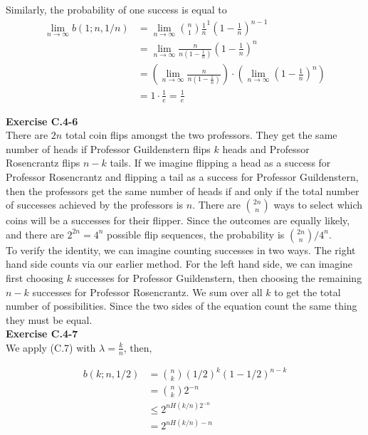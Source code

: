 \documentclass{article}
\begin{document}
Similarly, the probability of one success is equal to
\begin{align*}
\lim_{n\rightarrow\infty}b(1;n,1/n) &= \lim_{n\rightarrow \infty} \binom{n}{1} \frac{1}{n}^1 (1- \frac{1}{n})^{n-1}\\
&=\lim_{n\rightarrow \infty} \frac{n}{n(1-\frac{1}{n})} (1- \frac{1}{n})^{n}\\
&=\left(\lim_{n\rightarrow \infty} \frac{n}{n(1-\frac{1}{n})}\right) \cdot \left( \lim_{n\rightarrow\infty} (1- \frac{1}{n})^{n}\right)\\
&= 1 \cdot \frac{1}{e} = \frac{1}{e}
\end{align*}

\noindent\textbf{Exercise C.4-6}\\

There are $2n$ total coin flips amongst the two professors.  They get the same number of heads if Professor Guildenstern flips $k$ heads and Professor Rosencrantz flips $n-k$ tails. If we imagine flipping a head as a success for Professor Rosencrantz and flipping a tail as a success for Professor Guildenstern, then the professors get the same number of heads if and only if the total number of successes achieved by the professors is $n$.  There are ${2n \choose n}$ ways to select which coins will be a successes for their flipper.  Since the outcomes are equally likely, and there are $2^{2n} = 4^n$ possible flip sequences, the probability is ${2n \choose n} / 4^n$.  \\

To verify the identity, we can imagine counting successes in two ways.  The right hand side counts via our earlier method.  For the left hand side, we can imagine first choosing $k$ successes for Professor Guildenstern, then choosing the remaining $n-k$ successes for Professor Rosencrantz.  We sum over all $k$ to get the total number of possibilities.  Since the two sides of the equation count the same thing they must be equal. \\

\noindent\textbf{Exercise C.4-7}\\
We apply (C.7) with $\lambda = \frac{k}{n}$, then,

\begin{align*}
b(k;n,1/2) &= \binom{n}{k} (1/2)^k (1-1/2)^{n-k}\\
&= \binom{n}{k} 2^{-n}\\
&\le 2^{nH(k/n) 2^{-n}}\\
& = 2^{nH(k/n) - n}
\end{align*}
\end{document}
